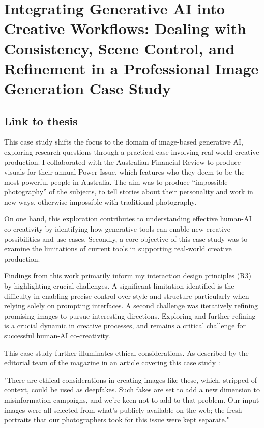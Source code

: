 \chapter{Integrating Generative AI into Creative Workflows: Dealing with Consistency, Scene Control, and Refinement in a Professional Image Generation Case Study} \label{c:tc6} 

\section{Link to thesis}

This case study shifts the focus to the domain of image-based generative AI, exploring research questions through a practical case involving real-world creative production. I collaborated with the Australian Financial Review to produce visuals for their annual Power Issue, which features who they deem to be the most powerful people in Australia. The aim was to produce “impossible photography” of the subjects, to tell stories about their personality and work in new ways, otherwise impossible with traditional photography. 

On one hand, this exploration contributes to understanding effective human-AI co-creativity by identifying how generative tools can enable new creative possibilities and use cases. Secondly, a core objective of this case study was to examine the limitations of current tools in supporting real-world creative production. 

Findings from this work primarily inform my interaction design principles (R3) by highlighting crucial challenges. A significant limitation identified is the difficulty in enabling precise control over style and structure particularly when relying solely on prompting interfaces. A second challenge was iteratively refining promising images to pursue interesting directions. Exploring and further refining is a crucial dynamic in creative processes, and remains a critical challenge for successful human-AI co-creativity.

This case study further illuminates ethical considerations. As described by the editorial team of the magazine in an article covering this case study \cite{Drummond2023-bh}:

"There are ethical considerations in creating images like these, which, stripped of context, could be used as deepfakes. Such fakes are set to add a new dimension to misinformation campaigns, and we’re keen not to add to that problem. Our input images were all selected from what’s publicly available on the web; the fresh portraits that our photographers took for this issue were kept separate."

